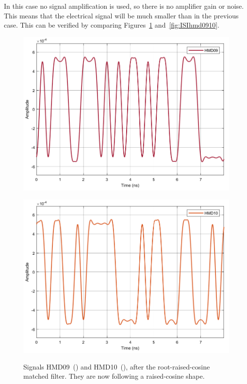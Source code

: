 In this case no signal amplification is used, so there is no amplifier gain or 
noise. This means that the electrical signal will be much smaller than in the 
previous case. This can be verified by comparing 
Figures~\ref{fig:sim_thermalHmd0910} and~\ref{fig:ISIhmd0910}.

	\begin{figure}[H]
	\centering
	\begin{minipage}{0.45\textwidth}
		\centering
		\includegraphics[width=1\textwidth]		
		{./sdf/m_qam_system/figures/simulations/02_thermal/HMD09.pdf}
		\subcaption{}\label{fig:sim_thermalHmd09}
	\end{minipage}
	\begin{minipage}{0.45\textwidth}
		\centering
		\includegraphics[width=1\textwidth]
		{sdf/m_qam_system/figures/simulations/02_thermal/HMD10.pdf}
		\subcaption{}\label{fig:sim_thermalHmd10}
	\end{minipage}
	\caption{Signals HMD09~() and 
		HMD10~(), after the root-raised-cosine matched 
		filter. They are now following a raised-cosine 
		shape.}\label{fig:sim_thermalHmd0910}
\end{figure}

